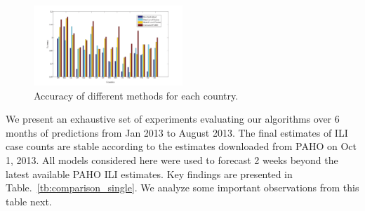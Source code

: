 
\begin{figure}[h]
\centering
\includegraphics[width=0.5\textwidth]{fig/accs}
\caption{Accuracy of different methods for each country.}
\label{fig:accuracies}
\end{figure}

We present an exhaustive set of experiments evaluating our algorithms 
over 6 months of predictions 
from Jan 2013 to August 2013. The final estimates of ILI case counts are stable according
to the estimates downloaded from PAHO on Oct 1, 2013. All models considered here were
used to forecast 2 weeks beyond the latest available PAHO ILI estimates. 
Key findings
are presented in 
Table.~\ref{tb:comparison_single}. We analyze 
some important observations from this table next.

